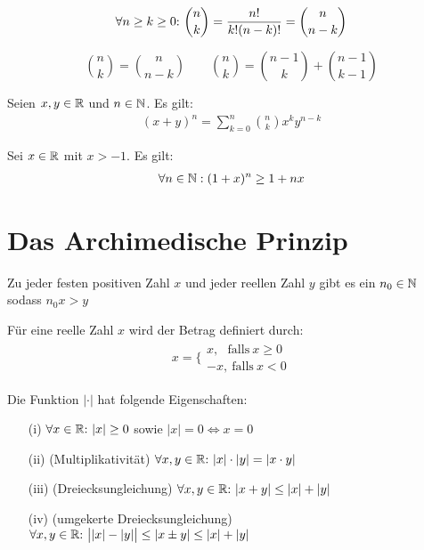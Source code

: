 \begin{frameddefn}
\begin{align*}
	\forall n \geq k \geq 0{:}\  {n\choose k} = \frac{n!}{k! (n-k)!} = {n\choose n-k}
\end{align*}
\end{frameddefn}

\begin{framedquest}
	\[
	{n\choose k} = {n\choose {n-k}}\qquad {n\choose k} = {{n-1}\choose k} + {{n-1}\choose {k-1}}
	\]
\end{framedquest}

\begin{framedthm}
	Seien $x,y \in \mathbb{R}$ und $n \in \mathbb{N}$. Es gilt:
	\begin{align*}
		(x+y)^n = \sum_{k=0}^{n} {n\choose k} x^k y^{n-k}
	\end{align*}
\end{framedthm}


\begin{framedthm}
	Sei $x\in \mathbb{R}$ mit $x > -1$. Es gilt:
	\begin{align*}
		\forall n \in \mathbb{N}: (1 + x)^n \geq 1 + nx
	\end{align*}
\end{framedthm}

\section{Das Archimedische Prinzip}


\begin{framedthm}
	Zu jeder festen positiven Zahl $x$ und jeder reellen Zahl $y$ gibt es ein $n_0 \in \mathbb{N}$ sodass $n_0 x > y$
\end{framedthm}

\begin{frameddefn}[Absolutbetrag]
	Für eine reelle Zahl $x$ wird der Betrag definiert durch:
	\begin{align*}
		x = \biggl\{\begin{array}{ll}
			x, \ \ \ \textrm{falls}\  x \geq 0 \\
			-x, \  \textrm{falls}\  x < 0
		\end{array}
	\end{align*}
\end{frameddefn}

\begin{framedthm}
	Die Funktion $|\cdot|$ hat folgende Eigenschaften:
	\begin{enumerate}
		\item[(i)] $\forall x \in \mathbb{R}{:}\  |x| \geq 0$ sowie $|x| = 0 \iff x = 0$
		\item [(ii)] (Multiplikativität) $\forall x,y \in \mathbb{R}{:}\  |x|\cdot|y| = |x\cdot y|$
		\item[(iii)] (Dreiecksungleichung) $\forall x,y \in \mathbb{R}{:}\  |x+y| \leq |x| + |y|$
		\item[(iv)] (umgekerte Dreiecksungleichung) $\forall x,y \in \mathbb{R}{:}\  \big||x| - |y|\big| \leq |x \pm y| \leq |x| + |y|$
	\end{enumerate}
\end{framedthm}


